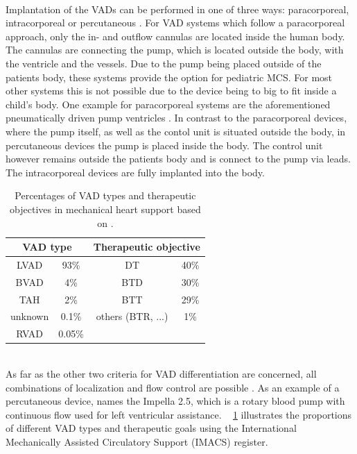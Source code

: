 \\Implantation of the VADs can be performed in one of three ways: paracorporeal, intracorporeal or percutaneous \cite{VAD7}. For VAD systems which follow a paracorporeal approach, only the in- and outflow cannulas are located inside the human body. The cannulas are connecting the pump, which is located outside the body, with the ventricle and the vessels. Due to the pump being placed outside of the patients body, these systems provide the option for pediatric MCS. For most other systems this is not possible due to the device being to big to fit inside a child's body. \cite{VAD10} One example for paracorporeal systems are the aforementioned pneumatically driven pump ventricles \cite{VAD1}. In contrast to the paracorporeal devices, where the pump itself, as well as the contol unit is situated outside the body, in percutaneous devices the pump is placed inside the body. The control unit however remains outside the patients body and is connect to the pump via leads. The intracorporeal devices are fully implanted into the body. \cite{VAD10}
\begin{table}[h]
  \centering
  \begin{tabular}{cc|cc}
    \toprule
    \multicolumn{2}{c|}{VAD type} &
    \multicolumn{2}{c}{Therapeutic objective} \\
    \midrule
    LVAD & 93\% & DT & 40\%\\
    BVAD & 4\% & BTD & 30\%\\
    TAH & 2\% & BTT & 29\%\\
    unknown & 0.1\% & others (BTR, ...) & 1\%\\
    RVAD & 0.05\% & &\\
    \bottomrule
\end{tabular}
  \caption[Distribution of VAD types and therapeutic objectives]{Percentages of VAD types and therapeutic objectives in mechanical heart support based on \cite{VAD7}.}
  \label{tab:Table2}
\end{table}
\\As far as the other two criteria for VAD differentiation are concerned, all combinations of localization and flow control are possible \cite{VAD10}. As an example of a percutaneous device, \cite{VAD7} names the Impella 2.5, which is a rotary blood pump with continuous flow used for left ventricular assistance. \tablename~ \ref{tab:Table2} illustrates the proportions of different VAD types and therapeutic goals using the International Mechanically Assisted Circulatory Support (IMACS) register.
